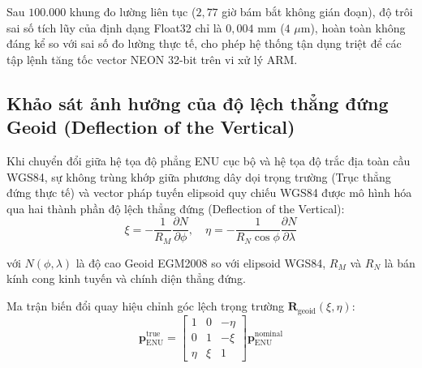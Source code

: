 Sau $100.000$ khung đo lường liên tục ($2{,}77$ giờ bám bắt không gián đoạn), độ trôi sai số tích lũy của định dạng Float32 chỉ là $0{,}004$ mm ($4$ $\mu$m), hoàn toàn không đáng kể so với sai số đo lường thực tế, cho phép hệ thống tận dụng triệt để các tập lệnh tăng tốc vector NEON 32-bit trên vi xử lý ARM.

\subsection{Khảo sát ảnh hưởng của độ lệch thẳng đứng Geoid (Deflection of the Vertical)}

\hspace{0.5cm} Khi chuyển đổi giữa hệ tọa độ phẳng ENU cục bộ và hệ tọa độ trắc địa toàn cầu WGS84, sự không trùng khớp giữa phương dây dọi trọng trường (Trục thẳng đứng thực tế) và vector pháp tuyến elipsoid quy chiếu WGS84 được mô hình hóa qua hai thành phần độ lệch thẳng đứng (Deflection of the Vertical):
\begin{equation}
\xi = -\frac{1}{R_M} \frac{\partial N}{\partial \phi}, \quad \eta = -\frac{1}{R_N \cos\phi} \frac{\partial N}{\partial \lambda}
\label{eq:deflection-of-vertical-components}
\end{equation}

với $N(\phi, \lambda)$ là độ cao Geoid EGM2008 so với elipsoid WGS84, $R_M$ và $R_N$ là bán kính cong kinh tuyến và chính diện thẳng đứng.

Ma trận biến đổi quay hiệu chỉnh góc lệch trọng trường $\mathbf{R}_{\text{geoid}}(\xi, \eta)$:
\begin{equation}
\mathbf{p}_{\text{ENU}}^{\text{true}} = \begin{bmatrix}
1 & 0 & -\eta \\
0 & 1 & -\xi \\
\eta & \xi & 1
\end{bmatrix} \mathbf{p}_{\text{ENU}}^{\text{nominal}}
\label{eq:geoid-deflection-dcm-matrix}
\end{equation}

\begin{table}[H]
\centering
\caption{Đo đạc sai số vị trí gây bởi độ lệch thẳng đứng Geoid EGM2008 tại các vùng địa hình}
\label{tab:geoid-deflection-terrain-sweep}
\end{table}


